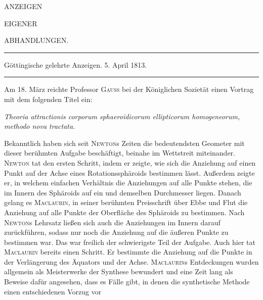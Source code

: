\clearpage
\thispagestyle{empty}
\begin{center}
\vspace*{2in}
{\Large ANZEIGEN\par}
\vspace{0.5in}
EIGENER\par
\vspace{0.5in}
{\Large ABHANDLUNGEN.\par}
\end{center}
\clearpage
{}
\begin{center}
\rule{0.85\textwidth}{0.3pt}\par
Göttingische gelehrte Anzeigen. 5. April 1813.\par
\rule{0.85\textwidth}{0.3pt}
\end{center}
\medskip
Am 18. März reichte Professor \textsc{Gauss} bei der Königlichen Sozietät einen Vortrag mit dem folgenden Titel ein:
\begin{center}
\textit{Theoria attractionis corporum sphaeroidicorum ellipticorum homogeneorum, methodo nova tractata.}
\end{center}
Bekanntlich haben sich seit \textsc{Newton}s Zeiten die bedeutendsten Geometer mit dieser berühmten Aufgabe beschäftigt, beinahe im Wettstreit miteinander. \textsc{Newton} tat den ersten Schritt, indem er zeigte, wie sich die Anziehung auf einen Punkt auf der Achse eines Rotationssphäroids bestimmen lässt. Außerdem zeigte er, in welchem einfachen Verhältnis die Anziehungen auf alle Punkte stehen, die im Innern des Sphäroids auf ein und demselben Durchmesser liegen. Danach gelang es \textsc{Maclaurin}, in seiner berühmten Preisschrift über Ebbe und Flut die Anziehung auf alle Punkte der Oberfläche des Sphäroids zu bestimmen. Nach \textsc{Newton}s Lehrsatz ließen sich auch die Anziehungen im Innern darauf zurückführen, sodass nur noch die Anziehung auf die äußeren Punkte zu bestimmen war. Das war freilich der schwierigste Teil der Aufgabe. Auch hier tat \textsc{Maclaurin} bereits einen Schritt. Er bestimmte die Anziehung auf die Punkte in der Verlängerung des Äquators und der Achse. \textsc{Maclaurin}s Entdeckungen wurden allgemein als Meisterwerke der Synthese bewundert und eine Zeit lang als Beweise dafür angesehen, dass es Fälle gibt, in denen die synthetische Methode einen entschiedenen Vorzug vor
